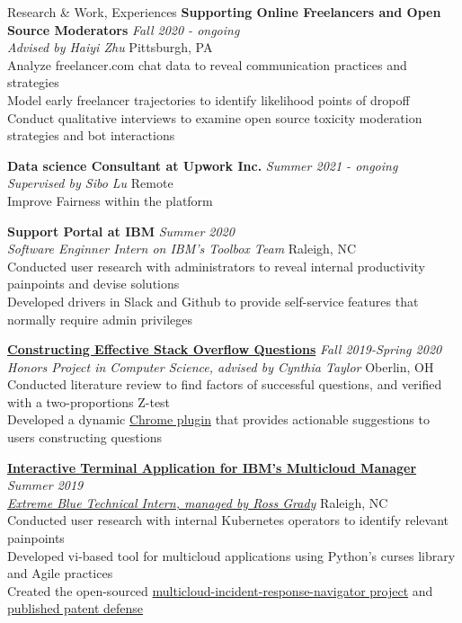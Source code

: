 \documentclass{resume}
\begin{document}
\begin{rSection}{Research \& Work, Experiences}
{\bf Supporting Online Freelancers and Open Source Moderators} \hfill  {\em Fall 2020 - ongoing} \\
{\it Advised by Haiyi Zhu} \hfill { Pittsburgh, PA} \\
{Analyze freelancer.com chat data to reveal communication practices and strategies} \\
{Model early freelancer trajectories to identify likelihood points of dropoff} \\
{Conduct qualitative interviews to examine open source toxicity moderation strategies and bot interactions}

{\bf Data science Consultant at Upwork Inc.} \hfill  {\em Summer 2021 - ongoing} \\
{\it Supervised by Sibo Lu} \hfill {Remote} \\
{Improve Fairness within the platform} 

{\bf Support Portal at IBM} \hfill  {\em Summer 2020} \\
{\it Software Enginner Intern on IBM's Toolbox Team} \hfill { Raleigh, NC} \\
{Conducted user research with administrators to reveal internal productivity painpoints and devise solutions} \\
{Developed drivers in Slack and Github to provide self-service features that normally require admin privileges}

\href{https://digitalcommons.oberlin.edu/cgi/viewcontent.cgi?article=1693&context=honors}{\bf Constructing Effective Stack Overflow Questions} \hfill  {\em Fall 2019-Spring 2020} \\
{\it Honors Project in Computer Science, advised by Cynthia Taylor} \hfill { Oberlin, OH} \\
{Conducted literature review to find factors of successful questions, and verified with a two-proportions Z-test} \\
{Developed a dynamic \href{https://github.com/janeon/honors-plugin}{Chrome plugin} that provides actionable suggestions to users constructing questions}

\href{https://github.com/IBM/multicloud-incident-response-navigator}{\bf Interactive Terminal Application for IBM's Multicloud Manager} \hfill  {\em Summer 2019} \\
\href{https://www.ibm.com/employment/extremeblue/index.html}{\em Extreme Blue Technical Intern, managed by Ross Grady} \hfill { Raleigh, NC} \\
{Conducted user research with internal Kubernetes operators to identify relevant painpoints} \\
Developed vi-based tool for multicloud applications using Python's curses library and Agile practices \\
{Created the open-sourced \href{https://github.com/IBM/multicloud-incident-response-navigator}{multicloud-incident-response-navigator project}} and \href{https://priorart.ip.com/IPCOM/000262660}{published patent defense}


\end{rSection}
\end{document}
